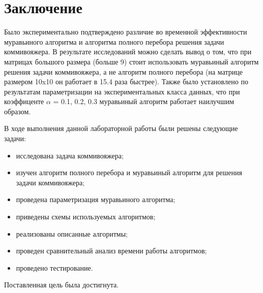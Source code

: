 \chapter*{Заключение}

Было экспериментально подтверждено различие во временной эффективности муравьиного алгоритма и алгоритма полного перебора решения задачи коммивояжера. В результате исследований можно сделать вывод о том, что при матрицах большого размера (больше 9) стоит использовать муравьиный алгоритм решения задачи коммивояжера, а не алгоритм полного перебора (на матрице размером 10x10 он работает в 15.4 раза быстрее). Также было установлено по результатам параметризации на экспериментальных класса данных, что при коэффиценте $\alpha$ = 0.1, 0.2, 0.3 муравьиный алгоритм работает наилучшим образом.
\vspace{5mm}

В ходе выполнения данной лабораторной работы были решены следующие задачи:
\begin{itemize}[label=---]
	\item исследована задача коммивояжера;
	\item изучен алгоритм полного перебора и муравьиный алгоритм для решения задачи коммивояжера;
	\item проведена параметризация муравьиного алгоритма;
	\item приведены схемы используемых алгоритмов;
	\item реализованы описанные алгоритмы;
	\item проведен сравнительный анализ времени работы алгоритмов;
	\item проведено тестирование.
\end{itemize}

Поставленная цель была достигнута.
